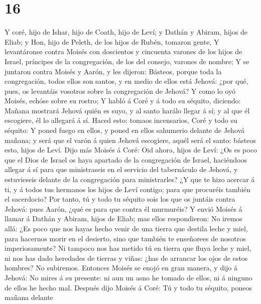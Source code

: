 \hypertarget{section-15}{%
\section{16}\label{section-15}}

 Y coré, hijo de Ishar, hijo de Coath, hijo de Leví; y
Dathán y Abiram, hijos de Eliab; y Hon, hijo de Peleth, de los hijos de
Rubén, tomaron gente,  Y levantáronse contra Moisés con
doscientos y cincuenta varones de los hijos de Israel, príncipes de la
congregación, de los del consejo, varones de nombre;  Y se
juntaron contra Moisés y Aarón, y les dijeron: Básteos, porque toda la
congregación, todos ellos son santos, y en medio de ellos está Jehová:
¿por qué, pues, os levantáis vosotros sobre la congregación de Jehová?
 Y como lo oyó Moisés, echóse sobre su rostro; 
Y habló á Coré y á todo su séquito, diciendo: Mañana mostrará Jehová
quién es suyo, y al santo harálo llegar á sí; y al que él escogiere, él
lo allegará á sí.  Haced esto: tomaos incensarios, Coré y
todo su séquito:  Y poned fuego en ellos, y poned en ellos
sahumerio delante de Jehová mañana; y será que el varón á quien Jehová
escogiere, aquél será el santo: básteos esto, hijos de Leví.
 Dijo más Moisés á Coré: Oid ahora, hijos de Leví:
 ¿Os es poco que el Dios de Israel os haya apartado de la
congregación de Israel, haciéndoos allegar á sí para que ministraseis en
el servicio del tabernáculo de Jehová, y estuvieseis delante de la
congregación para ministrarles?  ¿Y que te hizo acercar á
ti, y á todos tus hermanos los hijos de Leví contigo; para que procuréis
también el sacerdocio?  Por tanto, tú y todo tu séquito
sois los que os juntáis contra Jehová: pues Aarón, ¿qué es para que
contra él murmuréis?  Y envió Moisés á llamar á Dathán y
Abiram, hijos de Eliab; mas ellos respondieron: No iremos allá:
 ¿Es poco que nos hayas hecho venir de una tierra que
destila leche y miel, para hacernos morir en el desierto, sino que
también te enseñorees de nosotros imperiosamente?  Ni
tampoco nos has metido tú en tierra que fluya leche y miel, ni nos has
dado heredades de tierras y viñas: ¿has de arrancar los ojos de estos
hombres? No subiremos.  Entonces Moisés se enojó en gran
manera, y dijo á Jehová: No mires á su presente: ni aun un asno he
tomado de ellos, ni á ninguno de ellos he hecho mal. 
Después dijo Moisés á Coré: Tú y todo tu séquito, poneos mañana delante
